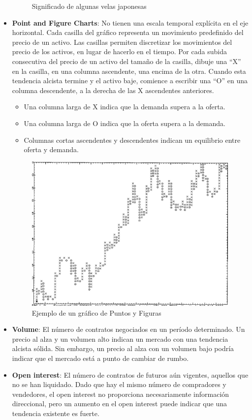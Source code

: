 \begin{itemize}
\begin{figure}[H]
            \caption{Significado de algunas velas japonesas}
            \label{fig:meanings_candlesticks}
        \end{figure}
    \item \textbf{Point and Figure Charts}: No tienen una escala temporal explícita en el eje horizontal. Cada casilla del gráfico representa un movimiento predefinido del precio de un activo. Las casillas permiten discretizar los movimientos del precio de los activos, en lugar de hacerlo en el tiempo. Por cada subida consecutiva del precio de un activo del tamaño de la casilla, dibuje una ``X'' en la casilla, en una columna ascendente, una encima de la otra. Cuando esta tendencia alcista termine y el activo baje, comience a escribir una ``O'' en una columna descendente, a la derecha de las X ascendentes anteriores.
        \begin{itemize}
            \item Una columna larga de X indica que la demanda supera a la oferta.
            \item Una columna larga de O indica que la oferta supera a la demanda.
            \item Columnas cortas ascendentes y descendentes indican un equilibrio entre oferta y demanda.
        \end{itemize}
        \begin{figure}[H]
            \centering
            \includegraphics[width=0.65\linewidth]{Imagenes/16_Prediccion/Point Figure Chart.png}
            \caption{Ejemplo de un gráfico de Puntos y Figuras}
        \end{figure}
    \item \textbf{Volume}: El número de contratos negociados en un período determinado. Un precio al alza y un volumen alto indican un mercado con una tendencia alcista sólida. Sin embargo, un precio al alza con un volumen bajo podría indicar que el mercado está a punto de cambiar de rumbo.
    \item \textbf{Open interest}: El número de contratos de futuros aún vigentes, aquellos que no se han liquidado. Dado que hay el mismo número de compradores y vendedores, el open interest no proporciona necesariamente información direccional, pero un aumento en el open interest puede indicar que una tendencia existente es fuerte.
\end{itemize}





